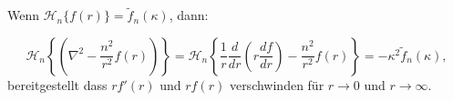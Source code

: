 \begin{satz}
Wenn $\mathscr{H}_n\{f(r)\}=\tilde{f}_n(\kappa)$, dann:

\begin{equation*}
	\mathscr{H}_n \left\{ \left( \nabla^2 - \frac{n^2}{r^2} f(r)\right)\right\}= \mathscr{H}_n\left\{\frac{1}{r}\frac{d}{dr}\left(r\frac{df}{dr}\right) - \frac{n^2}{r^2}f(r)\right\}=-\kappa^2\tilde{f}_{n}(\kappa),
\end{equation*}
bereitgestellt dass $rf'(r)$ und $rf(r)$ verschwinden für $r\to0$ und $r\to\infty$.
\end{satz}

